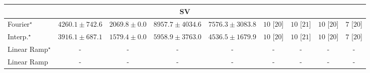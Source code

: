 \begin{tabular}{l|cccc|cccc|}
\cline{1-9}
\multicolumn{9}{c}{\rule{0pt}{8pt}SV} \\
\midrule
Fourier$^\star$ & {\cellcolor[HTML]{A9BFDC}} \color[HTML]{000000} $4260.1\pm 742.6$ & {\cellcolor[HTML]{F5EEF6}} \color[HTML]{000000} $2069.8\pm 0.0$ & {\cellcolor[HTML]{023858}} \color[HTML]{F1F1F1} $8957.7\pm 4034.6$ & {\cellcolor[HTML]{04649E}} \color[HTML]{F1F1F1} $7576.3\pm 3083.8$ & {\cellcolor[HTML]{49006A}} \color[HTML]{F1F1F1} $10$ [$20$] & {\cellcolor[HTML]{49006A}} \color[HTML]{F1F1F1} $10$ [$21$] & {\cellcolor[HTML]{49006A}} \color[HTML]{F1F1F1} $10$ [$20$] & {\cellcolor[HTML]{CD238F}} \color[HTML]{F1F1F1} $7$ [$20$] \\
Interp.$^\star$ & {\cellcolor[HTML]{B9C6E0}} \color[HTML]{000000} $3916.1\pm 687.1$ & {\cellcolor[HTML]{FFF7FB}} \color[HTML]{000000} $1579.4\pm 0.0$ & {\cellcolor[HTML]{4697C4}} \color[HTML]{F1F1F1} $5958.9\pm 3763.0$ & {\cellcolor[HTML]{9CB9D9}} \color[HTML]{000000} $4536.5\pm 1679.9$ & {\cellcolor[HTML]{49006A}} \color[HTML]{F1F1F1} $10$ [$20$] & {\cellcolor[HTML]{49006A}} \color[HTML]{F1F1F1} $10$ [$21$] & {\cellcolor[HTML]{49006A}} \color[HTML]{F1F1F1} $10$ [$20$] & {\cellcolor[HTML]{CD238F}} \color[HTML]{F1F1F1} $7$ [$20$] \\
Linear Ramp$^\star$ & {\cellcolor[HTML]{000000}} \color[HTML]{F1F1F1} {\cellcolor{white}} \color{black} - & {\cellcolor[HTML]{000000}} \color[HTML]{F1F1F1} {\cellcolor{white}} \color{black} - & {\cellcolor[HTML]{000000}} \color[HTML]{F1F1F1} {\cellcolor{white}} \color{black} - & {\cellcolor[HTML]{000000}} \color[HTML]{F1F1F1} {\cellcolor{white}} \color{black} - & {\cellcolor[HTML]{000000}} \color[HTML]{F1F1F1} {\cellcolor{white}} \color{black} - & {\cellcolor[HTML]{000000}} \color[HTML]{F1F1F1} {\cellcolor{white}} \color{black} - & {\cellcolor[HTML]{000000}} \color[HTML]{F1F1F1} {\cellcolor{white}} \color{black} - & {\cellcolor[HTML]{000000}} \color[HTML]{F1F1F1} {\cellcolor{white}} \color{black} - \\
Linear Ramp & {\cellcolor[HTML]{000000}} \color[HTML]{F1F1F1} {\cellcolor{white}} \color{black} - & {\cellcolor[HTML]{000000}} \color[HTML]{F1F1F1} {\cellcolor{white}} \color{black} - & {\cellcolor[HTML]{000000}} \color[HTML]{F1F1F1} {\cellcolor{white}} \color{black} - & {\cellcolor[HTML]{000000}} \color[HTML]{F1F1F1} {\cellcolor{white}} \color{black} - & {\cellcolor[HTML]{000000}} \color[HTML]{F1F1F1} {\cellcolor{white}} \color{black} - & {\cellcolor[HTML]{000000}} \color[HTML]{F1F1F1} {\cellcolor{white}} \color{black} - & {\cellcolor[HTML]{000000}} \color[HTML]{F1F1F1} {\cellcolor{white}} \color{black} - & {\cellcolor[HTML]{000000}} \color[HTML]{F1F1F1} {\cellcolor{white}} \color{black} - \\

\end{tabular}
